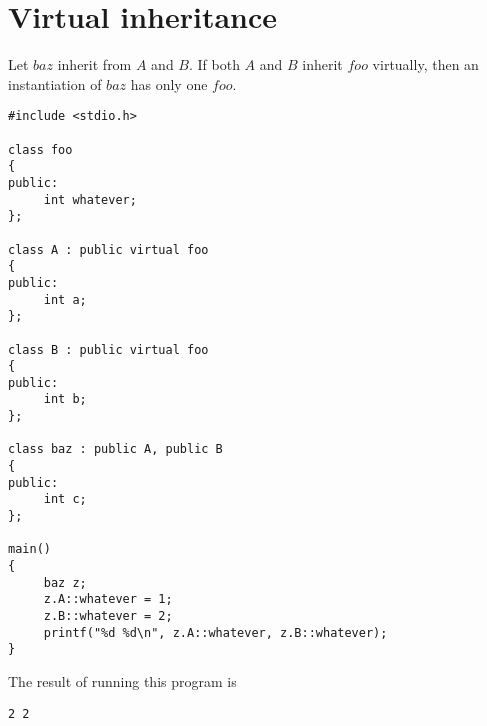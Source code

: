 \documentclass{article}
\begin{document}
\section*{Virtual inheritance}

Let $baz$ inherit from $A$ and $B$.
If both $A$ and $B$ inherit $foo$ virtually,
then an instantiation of $baz$ has only one $foo$.

\medskip
\noindent
\begin{verbatim}
#include <stdio.h> 

class foo 
{ 
public: 
     int whatever; 
}; 

class A : public virtual foo 
{ 
public: 
     int a; 
}; 

class B : public virtual foo 
{ 
public: 
     int b; 
}; 

class baz : public A, public B 
{ 
public: 
     int c; 
}; 

main() 
{ 
     baz z; 
     z.A::whatever = 1; 
     z.B::whatever = 2; 
     printf("%d %d\n", z.A::whatever, z.B::whatever); 
} 
\end{verbatim}

\medskip
\noindent
The result of running this program is

\medskip
\noindent
\begin{verbatim}
2 2
\end{verbatim}
\end{document}
